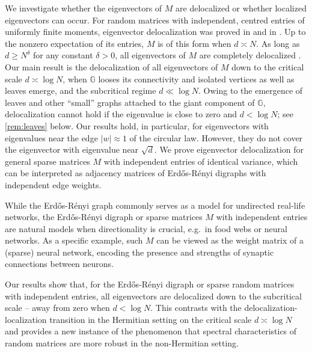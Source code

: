 \documentclass[11pt]{article}
\newcommand{\abs}[1]{\left| #1 \right|}
\theoremstyle{plain}
\theoremstyle{remark}
\numberwithin{equation}{section}
\begin{document}
	We investigate whether the eigenvectors of $M$ are delocalized or whether localized eigenvectors can occur.
	For random matrices with independent, centred entries of uniformly finite moments, 
	eigenvector delocalization was proved in \cite{MR3405592} and in 
	\cite{AEKinhomogeneous}. Up to the nonzero expectation of its entries, $M$ is of this form when $d\asymp N$. 
	As long as $d \geq N^\delta$ for any constant $\delta >0$, all eigenvectors of $M$ 
	are completely delocalized \cite{HeDigraph}. 
	Our main result is the delocalization of all eigenvectors of $M$ down to the critical scale $
	d \asymp \log N$, when $\mathbb{G}$ looses its connectivity and isolated vertices 
	as well as leaves emerge, and the subcritical regime $d \ll \log N$. 
	Owing to the emergence of leaves and other ``small'' graphs attached to the giant 
	component of $\mathbb{G}$, delocalization cannot hold if the eigenvalue is close to zero and $d < \log N$; see \cref{rem:leaves} below. 
	Our results hold, in particular, for eigenvectors with eigenvalues near the edge $\abs{w} \approx 1$ of the circular law. However, they do not cover the eigenvector with eigenvalue near $\sqrt{d}$. We prove eigenvector delocalization for general sparse matrices $M$ with independent entries of identical variance, which can be interpreted as adjacency matrices of Erd{\H o}s-R\'enyi digraphs
	with independent edge weights. 
	
		While the Erd{\H o}s-R\'enyi graph commonly serves as a model for undirected real-life networks, 
	the Erd{\H o}s-R\'enyi digraph or sparse matrices $M$ with independent entries are natural models when directionality is crucial, e.g.\ in 
	food webs or neural networks. 
	As a specific example, such $M$ can be viewed as the weight matrix of a (sparse) neural network, encoding the presence and strengths of synaptic connections between neurons.

	
	Our results show that, for the Erd{\H o}s-R\'enyi digraph or sparse random matrices with independent entries,  
	all eigenvectors are delocalized down to the subcritical scale -- away from zero when $d < \log N$. 
This contrasts with the delocalization-localization transition in the Hermitian setting on the critical scale $d \asymp \log N$ 
and provides a new instance of the phenomenon that spectral characteristics of random matrices are more robust in the non-Hermitian setting. 
	
\end{document}
